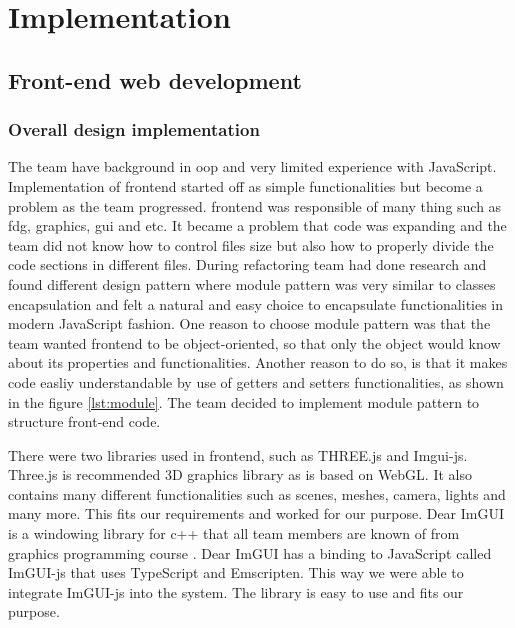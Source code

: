 \chapter{Implementation}
\label{chap:implementation}

\section{Front-end web development}
\subsection{Overall design implementation}



The team have background in \gls{oop} and very limited experience with JavaScript. Implementation of \gls{frontend} started off as simple functionalities but become a problem as the team progressed. \Gls{frontend} was responsible of many thing such as \gls{fdg}, graphics, \gls{gui} and etc. It became a problem that code was expanding and the team did not know how to control files size but also how to properly divide the code sections in different files.
During refactoring team had done research and found different design pattern where module pattern \cite{scotch:javascriptpatterns} was very similar to classes encapsulation and felt a natural and easy choice to encapsulate functionalities in modern JavaScript fashion. One reason to choose module pattern was that the team wanted \gls{frontend} to be object-oriented, so that only the object would know about its properties and functionalities. Another reason to do so, is that it makes code easliy understandable by use of getters and setters functionalities, as shown in the figure \ref{lst:module}.
The team decided to implement module pattern to structure front-end code. 

There were two libraries used in \gls{frontend}, such as THREE.js and Imgui-js. Three.js is recommended \cite{cmarix:threejs} 3D graphics library as is based on WebGL. It also contains many different functionalities such as scenes, meshes, camera, lights and many more. This fits our requirements and worked for our purpose. Dear ImGUI is a windowing library for c++ that all team members are known of from graphics programming course \cite{course:graphics}. Dear ImGUI has a binding to JavaScript called ImGUI-js that uses TypeScript and Emscripten. This way we were able to integrate ImGUI-js into the system. The library is easy to use and fits our purpose.


